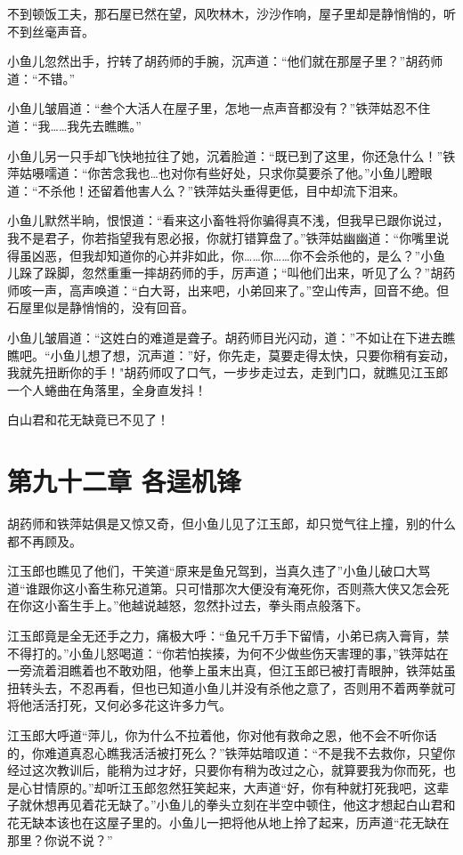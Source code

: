 \documentclass[12pt,oneside]{book}
\begin{document}
不到顿饭工夫，那石屋已然在望，风吹林木，沙沙作响，屋子里却是静悄悄的，听不到丝毫声音。

小鱼儿忽然出手，拧转了胡药师的手腕，沉声道：``他们就在那屋子里？''胡药师道：``不错。''

小鱼儿皱眉道：``叁个大活人在屋子里，怎地一点声音都没有？''铁萍姑忍不住道：``我\ldots\ldots 我先去瞧瞧。''

小鱼儿另一只手却飞快地拉往了她，沉着脸道：``既已到了这里，你还急什么！''铁萍姑嗫嚅道：``你苦念我也\ldots 也对你有些好处，只求你莫要杀了他。''小鱼儿瞪眼道：``不杀他！还留着他害人么？''铁萍姑头垂得更低，目中却流下泪来。

小鱼儿默然半晌，恨恨道：``看来这小畜牲将你骗得真不浅，但我早已跟你说过，我不是君子，你若指望我有恩必报，你就打错算盘了。''铁萍姑幽幽道：``你嘴里说得虽凶恶，但我却知道你的心并非如此，你\ldots\ldots 你\ldots\ldots 你不会杀他的，是么？''小鱼儿跺了跺脚，忽然重重一摔胡药师的手，厉声道；``叫他们出来，听见了么？''胡药师咳一声，高声唤道：``白大哥，出来吧，小弟回来了。''空山传声，回音不绝。但石屋里似是静悄悄的，没有回音。

小鱼儿皱眉道：``这姓白的难道是聋子。胡药师目光闪动，道：''不如让在下进去瞧瞧吧。``小鱼儿想了想，沉声道：''好，你先走，莫要走得太快，只要你稍有妄动，我就先扭断你的手！"胡药师叹了口气，一步步走过去，走到门口，就瞧见江玉郎一个人蜷曲在角落里，全身直发抖！

白山君和花无缺竟已不见了！

\hypertarget{ux7b2cux4e5dux5341ux4e8cux7ae0-ux5404ux901eux673aux950b}{%
\chapter{第九十二章
各逞机锋}\label{ux7b2cux4e5dux5341ux4e8cux7ae0-ux5404ux901eux673aux950b}}

胡药师和铁萍姑俱是又惊又奇，但小鱼儿见了江玉郎，却只觉气往上撞，别的什么都不再顾及。

江玉郎也瞧见了他们，干笑道``原来是鱼兄驾到，当真久违了''小鱼儿破口大骂道``谁跟你这小畜生称兄道第。只可惜那次大便没有淹死你，否则燕大侠又怎会死在你这小畜生手上。''他越说越怒，忽然扑过去，拳头雨点般落下。

江玉郎竟是全无还手之力，痛极大呼：``鱼兄千万手下留情，小弟已病入膏肓，禁不得打的。''小鱼儿怒喝道：``你若怕挨揍，为何不少做些伤天害理的事，''铁萍姑在一旁流着泪瞧着也不敢劝阻，他拳上虽末出真，但江玉郎已被打青眼肿，铁萍姑虽扭转头去，不忍再看，但也已知道小鱼儿并没有杀他之意了，否则用不着两拳就可将他活活打死，又何必多花这许多力气。

江玉郎大呼道``萍儿，你为什么不拉着他，你对他有救命之恩，他不会不听你话的，你难道真忍心瞧我活活被打死么？''铁萍姑暗叹道：``不是我不去救你，只望你经过这次教训后，能稍为过才好，只要你有稍为改过之心，就算要我为你而死，也是心甘情原的。''却听江玉郎忽然狂笑起来，大声道``好，你有种就打死我吧，这辈子就休想再见着花无缺了。''小鱼儿的拳头立刻在半空中顿住，他这才想起白山君和花无缺本该也在这屋子里的。小鱼儿一把将他从地上拎了起来，历声道``花无缺在那里？你说不说？''
\end{document}
